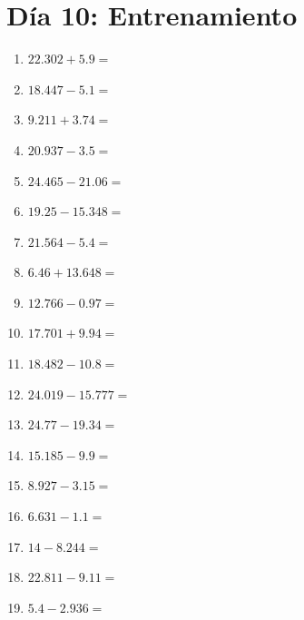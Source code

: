 \documentclass[12pt]{article}
\begin{document}
\section*{Día 10: Entrenamiento}
\begin{enumerate}
\item \large $ 22.302 + 5.9 = $ \vspace{1.5cm}
\item \large $ 18.447 - 5.1 = $ \vspace{1.5cm}
\item \large $ 9.211 + 3.74 = $ \vspace{1.5cm}
\item \large $ 20.937 - 3.5 = $ \vspace{1.5cm}
\item \large $ 24.465 - 21.06 = $ \vspace{1.5cm}
\item \large $ 19.25 - 15.348 = $ \vspace{1.5cm}
\item \large $ 21.564 - 5.4 = $ \vspace{1.5cm}
\item \large $ 6.46 + 13.648 = $ \vspace{1.5cm}
\item \large $ 12.766 - 0.97 = $ \vspace{1.5cm}
\item \large $ 17.701 + 9.94 = $ \vspace{1.5cm}
\newpage
\item \large $ 18.482 - 10.8 = $ \vspace{1.5cm}
\item \large $ 24.019 - 15.777 = $ \vspace{1.5cm}
\item \large $ 24.77 - 19.34 = $ \vspace{1.5cm}
\item \large $ 15.185 - 9.9 = $ \vspace{1.5cm}
\item \large $ 8.927 - 3.15 = $ \vspace{1.5cm}
\item \large $ 6.631 - 1.1 = $ \vspace{1.5cm}
\item \large $ 14 - 8.244 = $ \vspace{1.5cm}
\item \large $ 22.811 - 9.11 = $ \vspace{1.5cm}
\item \large $ 5.4 - 2.936 = $ \vspace{1.5cm}

\end{enumerate}
\end{document}
